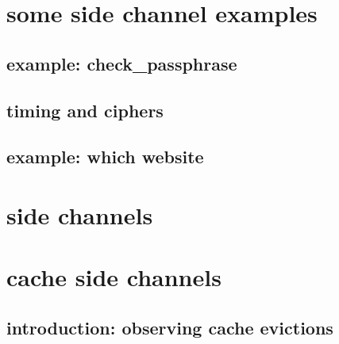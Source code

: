 
\section{some side channel examples}

\subsection{example: check\_passphrase}



\subsection{timing and ciphers}



\subsection{example: which website}






\section{side channels}


\section{cache side channels}

\subsection{introduction: observing cache evictions}



